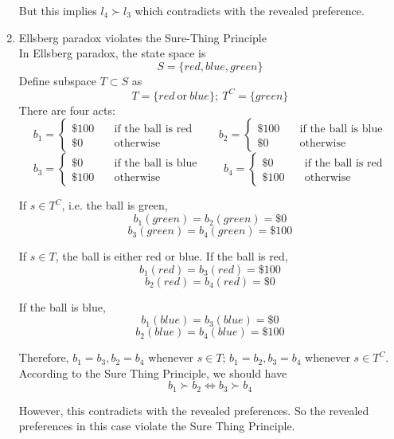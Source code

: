\documentclass{article}
\begin{document}
\begin{enumerate}
But this implies $l_4 \succ l_3 $ which contradicts with the revealed preference. \\


\item Ellsberg paradox violates the Sure-Thing Principle \\

In Ellsberg paradox, the state space is $$S = \{ red, blue, green \}$$
Define subspace $T \subset S$ as $$T=\{ red\ \textrm{or}\ blue \};\ T^C=\{ green \}$$
There are four acts:
$$ b_1 = 
    \begin{cases}
        \$100 \quad & \textrm{if the ball is red} \\
        \$0   \quad & \textrm{otherwise}
    \end{cases} \qquad
    b_2 = 
     \begin{cases}
         \$100 \quad & \textrm{if the ball is blue} \\
         \$0   \quad & \textrm{otherwise}
     \end{cases}
$$
$$ b_3 = 
    \begin{cases}
        \$0   \quad & \textrm{if the ball is blue} \\
        \$100 \quad & \textrm{otherwise}
    \end{cases} \qquad
    b_4 = 
     \begin{cases}
         \$0   \quad & \textrm{if the ball is red} \\
         \$100 \quad & \textrm{otherwise}
     \end{cases}
$$

If $s \in T^C$, i.e. the ball is green,
$$ b_1(green) = b_2(green) = \$0 $$
$$ b_3(green) = b_4(green) = \$100 $$

If $s \in T$, the ball is either red or blue. If the ball is red, 
$$ b_1(red) = b_3(red) = \$100 $$
$$ b_2(red) = b_4(red) = \$0 $$ 

If the ball is blue, 
$$ b_1(blue) = b_3(blue) = \$0 $$
$$ b_2(blue) = b_4(blue) = \$100 $$ 

Therefore, $b_1 = b_3, b_2 = b_4$ whenever $s \in T$; 
$b_1 = b_2, b_3 = b_4$ whenever $s \in T^C$.\\

According to the Sure Thing Principle, we should have
$$ b_1 \succ b_2 \iff b_3 \succ b_4 $$

However, this contradicts with the revealed preferences. 
So the revealed preferences in this case violate the Sure Thing Principle. \\

\end{enumerate}
\end{document}
